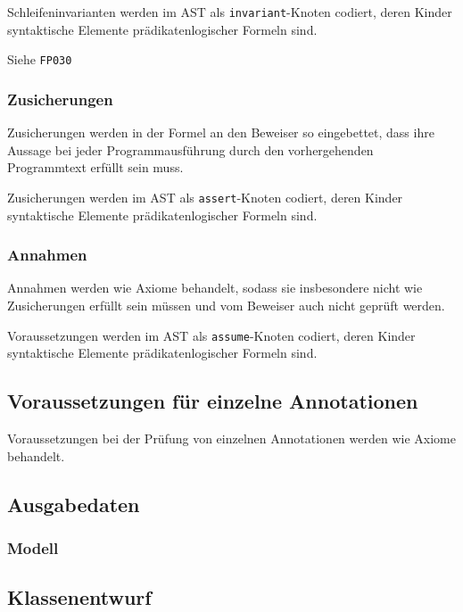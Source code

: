 Schleifeninvarianten werden im AST als \texttt{invariant}-Knoten
codiert, deren Kinder syntaktische Elemente prädikatenlogischer
Formeln sind.%

Siehe \texttt{FP030}%

\subsubsection{Zusicherungen}%

Zusicherungen werden in der Formel an den Beweiser so eingebettet,
dass ihre Aussage bei jeder Programmausführung durch den
vorhergehenden Programmtext erfüllt sein muss.%

Zusicherungen werden im AST als \texttt{assert}-Knoten codiert, deren
Kinder syntaktische Elemente prädikatenlogischer Formeln sind.%

\subsubsection{Annahmen}%

Annahmen werden wie Axiome behandelt, sodass sie insbesondere nicht
wie Zusicherungen erfüllt sein müssen und vom Beweiser auch nicht
geprüft werden.%

Voraussetzungen werden im AST als \texttt{assume}-Knoten codiert,
deren Kinder syntaktische Elemente prädikatenlogischer Formeln sind.%

\subsection{Voraussetzungen für einzelne Annotationen}%


Voraussetzungen bei der Prüfung von einzelnen Annotationen werden wie
Axiome behandelt.%

\subsection{Ausgabedaten}%

\subsubsection{Modell}%

\subsection{Klassenentwurf}%

